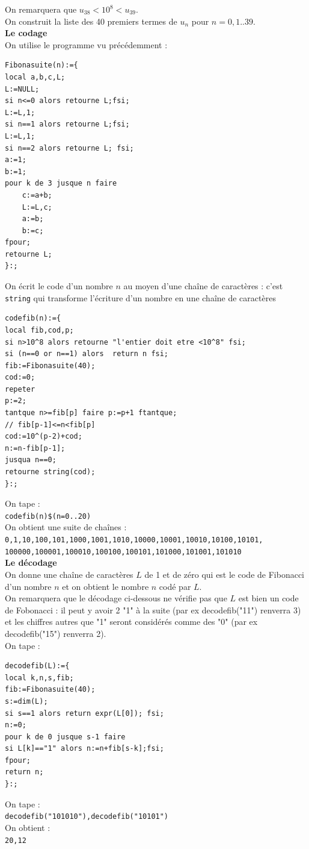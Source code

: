 \documentclass[a4paper,11pt]{book}
\begin{document}
On remarquera que $u_{38}<10^8<u_{39}$.\\
On construit la liste des 40 premiers termes de $u_n$ pour $n=0,1..39$.\\
{\bf Le codage}\\
On utilise le programme vu pr\'ec\'edemment :
\begin{verbatim}
Fibonasuite(n):={
local a,b,c,L;
L:=NULL;
si n<=0 alors retourne L;fsi;
L:=L,1;
si n==1 alors retourne L;fsi;
L:=L,1;
si n==2 alors retourne L; fsi;
a:=1;
b:=1;
pour k de 3 jusque n faire
    c:=a+b;
    L:=L,c;
    a:=b;
    b:=c;
fpour;
retourne L;   
}:;
\end{verbatim}
On \'ecrit  le code d'un nombre $n$ au moyen d'une chaîne de caract\`eres : 
c'est {\tt string} qui transforme l'\'ecriture d'un nombre en une chaîne
de caract\`eres 
\begin{verbatim}
codefib(n):={
local fib,cod,p;
si n>10^8 alors retourne "l'entier doit etre <10^8" fsi;
si (n==0 or n==1) alors  return n fsi;
fib:=Fibonasuite(40);
cod:=0;
repeter
p:=2;
tantque n>=fib[p] faire p:=p+1 ftantque;
// fib[p-1]<=n<fib[p]
cod:=10^(p-2)+cod;
n:=n-fib[p-1];
jusqua n==0;
retourne string(cod);
}:;
\end{verbatim}
On tape :\\
{\tt codefib(n)\$(n=0..20)}\\
On obtient une suite de chaînes :\\
{\tt 0,1,10,100,101,1000,1001,1010,10000,10001,10010,10100,10101,}\\
{\tt 100000,100001,100010,100100,100101,101000,101001,101010}\\
{\bf Le d\'ecodage}\\
On donne une chaîne de caract\`eres $L$ de 1 et de z\'ero qui est le code de 
Fibonacci d'un nombre $n$ et on obtient le nombre $n$ cod\'e par $L$.\\
On remarquera que le d\'ecodage ci-dessous ne v\'erifie pas que $L$ est bien un
code de Fobonacci : il peut y avoir 2 "1" \`a la suite (par ex decodefib("11") 
renverra 3) et les chiffres autres que "1" seront consid\'er\'es comme des "0"
(par ex decodefib("15") renverra 2).\\
On tape :
\begin{verbatim}
decodefib(L):={
local k,n,s,fib;
fib:=Fibonasuite(40);
s:=dim(L);
si s==1 alors return expr(L[0]); fsi; 
n:=0;
pour k de 0 jusque s-1 faire
si L[k]=="1" alors n:=n+fib[s-k];fsi; 
fpour;
return n;
}:;
\end{verbatim}
On tape :\\
{\tt decodefib("101010"),decodefib("10101")}\\
On obtient :\\
{\tt 20,12}
\end{document}
